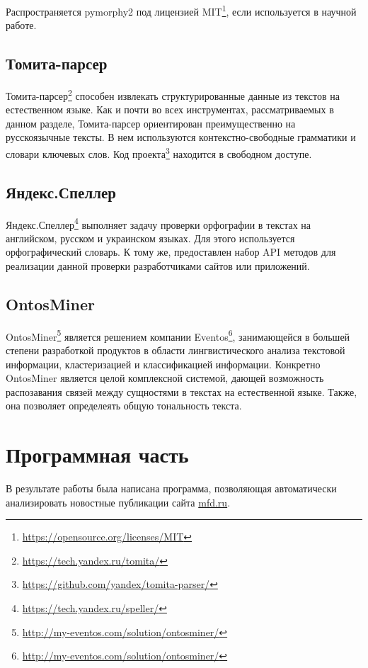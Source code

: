 \documentclass[14pt]{matmex-diploma-custom}
\begin{document}
Распространяется pymorphy2 под лицензией MIT\footnote{\url{https://opensource.org/licenses/MIT}}, если используется в научной работе.

\subsection{Томита-парсер}

Томита-парсер\footnote{\url{https://tech.yandex.ru/tomita/}} способен извлекать структурированные данные из текстов на естественном языке. Как и почти во всех инструментах, рассматриваемых в данном разделе, Томита-парсер ориентирован преимущественно на русскоязычные тексты. В нем используются контекстно-свободные грамматики и словари ключевых слов. Код проекта\footnote{\url{https://github.com/yandex/tomita-parser/}} находится в свободном доступе.

\subsection{Яндекс.Спеллер}

Яндекс.Спеллер\footnote{\url{https://tech.yandex.ru/speller/}} выполняет задачу проверки орфографии в текстах на английском, русском и украинском языках. Для этого используется орфографический словарь. К тому же, предоставлен набор API методов для реализации данной проверки разработчиками сайтов или приложений.

\subsection{OntosMiner}

OntosMiner\footnote{\url{http://my-eventos.com/solution/ontosminer/}} является решением компании Eventos\footnote{\url{http://my-eventos.com/solution/ontosminer/}}, занимающейся в большей степени разработкой продуктов в области лингвистического анализа текстовой информации, кластеризацией и классификацией информации. Конкретно OntosMiner является целой комплексной системой, дающей возможность распозавания связей между сущностями в текстах на естественной языке. Также, она позволяет определеять общую тональность текста.

\clearpage\section{Программная часть}

В результате работы была написана программа, позволяющая автоматически анализировать новостные публикации сайта \url{mfd.ru}.
\end{document}
